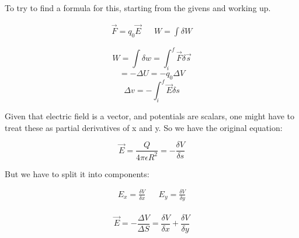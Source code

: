 \documentclass{article}
\begin{document}
To try to find a formula for this, starting from the givens and working up.

\begin{align*}
    \vec{F} = q_0 \vec{E} &  & W = \int \delta W
\end{align*}

$$W = \int \delta w =  \int_{i}^{f} \vec{F} \delta \vec{s}$$
$$ = - \Delta U = - q_0 \Delta V $$
$$ \Delta v = \boxed{-\int_{i}^{f} \vec{E} \delta s}$$

Given that electric field is a vector, and potentials are scalars, one might have to treat these as partial derivatives of x and y. So we have the original equation:

$$\vec{E} = \frac{Q}{4 \pi \epsilon R^2} = - \frac{\delta V}{\delta s}$$

But we have to split it into components:

\begin{align*}
    E_x = \frac{\delta V}{\delta x} &  & E_y = \frac{\delta V}{ \delta y} \\
\end{align*}

$$  \vec{E} = - \frac{\Delta V}{\Delta S} = \frac{\delta V}{\delta x} + \frac{\delta V}{\delta y}$$
\end{document}
